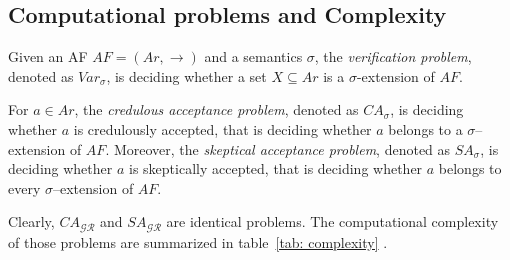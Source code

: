 









\subsection{Computational problems and Complexity}



Given an AF $AF=(Ar,\to)$ and a semantics $\sigma$, 
the \textit{verification problem}, 
denoted as $Var_\sigma$, 
is deciding whether a set $X \subseteq Ar$ is a $\sigma$-extension of $AF$. 







For $a \in Ar$, 
the \textit{credulous acceptance problem}, 
denoted as $CA_\sigma$, 
is deciding whether $a$ is credulously accepted, 
that is deciding whether $a$ belongs to a $\sigma$--extension of $AF$.  
% 
Moreover, 
the \textit{skeptical acceptance problem}, 
denoted as $SA_\sigma$, 
is deciding whether $a$ is skeptically  accepted, 
that is deciding whether $a$ belongs to every $\sigma$--extension of $AF$. 

Clearly, 
$CA_\mathcal{GR}$ and $SA_\mathcal{GR}$
are identical problems.
% 
The computational complexity of those problems are summarized in  table~\ref{tab: complexity} \cite{Dun.Woo2009,Dvo.Dun2018}.


